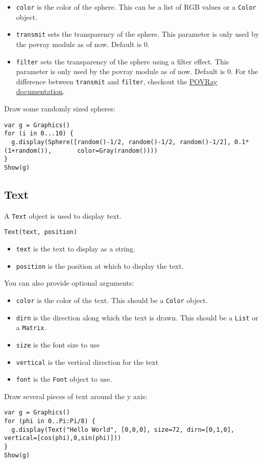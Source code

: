 \begin{itemize}

\item
  \texttt{color} is the color of the sphere. This can be a list of RGB
  values or a \texttt{Color} object.
\item
  \texttt{transmit} sets the transparency of the sphere. This parameter
  is only used by the povray module as of now. Default is 0.
\item
  \texttt{filter} sets the transparency of the sphere using a filter
  effect. This parameter is only used by the povray module as of now.
  Default is 0. For the difference between \texttt{transmit} and
  \texttt{filter}, checkout the
  \href{http://xahlee.info/3d/povray-glassy.html}{POVRay documentation}.
\end{itemize}

Draw some randomly sized spheres:

\begin{lstlisting}
var g = Graphics()
for (i in 0...10) {
  g.display(Sphere([random()-1/2, random()-1/2, random()-1/2], 0.1*(1+random()),       color=Gray(random())))
}
Show(g)
\end{lstlisting}

\hypertarget{text}{%
\subsection{Text}\label{text}}

A \texttt{Text} object is used to display text.

\begin{lstlisting}
Text(text, position)
\end{lstlisting}

\begin{itemize}

\item
  \texttt{text} is the text to display as a string.
\item
  \texttt{position} is the position at which to display the text.
\end{itemize}

You can also provide optional arguments:

\begin{itemize}

\item
  \texttt{color} is the color of the text. This should be a
  \texttt{Color} object.
\item
  \texttt{dirn} is the direction along which the text is drawn. This
  should be a \texttt{List} or a \texttt{Matrix}.
\item
  \texttt{size} is the font size to use
\item
  \texttt{vertical} is the vertical direction for the text
\item
  \texttt{font} is the \texttt{Font} object to use.
\end{itemize}

Draw several pieces of text around the y axis:

\begin{lstlisting}
var g = Graphics()
for (phi in 0..Pi:Pi/8) {
  g.display(Text("Hello World", [0,0,0], size=72, dirn=[0,1,0], vertical=[cos(phi),0,sin(phi)]))
}
Show(g)
\end{lstlisting}
